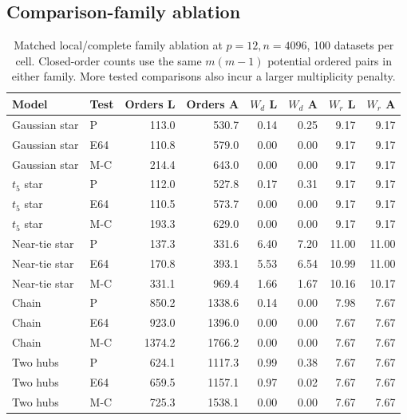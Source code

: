\subsection{Comparison-family ablation}
\begin{table}[htbp]\centering\small
\setlength{\tabcolsep}{4pt}
\caption{Matched local/complete family ablation at $p=12,n=4096$, 100 datasets per cell. Closed-order counts use the same $m(m-1)$ potential ordered pairs in either family. More tested comparisons also incur a larger multiplicity penalty.}\label{tab:family}
\begin{lrbox}{\resultsbox}\begin{tabular}{llrrrrrr}
\toprule
Model & Test & Orders L & Orders A & $W_d$ L & $W_d$ A & $W_r$ L & $W_r$ A\\
\midrule
Gaussian star & P & 113.0 & 530.7 & 0.14 & 0.25 & 9.17 & 9.17\\
Gaussian star & E64 & 110.8 & 579.0 & 0.00 & 0.00 & 9.17 & 9.17\\
Gaussian star & M-C & 214.4 & 643.0 & 0.00 & 0.00 & 9.17 & 9.17\\
$t_5$ star & P & 112.0 & 527.8 & 0.17 & 0.31 & 9.17 & 9.17\\
$t_5$ star & E64 & 110.5 & 573.7 & 0.00 & 0.00 & 9.17 & 9.17\\
$t_5$ star & M-C & 193.3 & 629.0 & 0.00 & 0.00 & 9.17 & 9.17\\
Near-tie star & P & 137.3 & 331.6 & 6.40 & 7.20 & 11.00 & 11.00\\
Near-tie star & E64 & 170.8 & 393.1 & 5.53 & 6.54 & 10.99 & 11.00\\
Near-tie star & M-C & 331.1 & 969.4 & 1.66 & 1.67 & 10.16 & 10.17\\
Chain & P & 850.2 & 1338.6 & 0.14 & 0.00 & 7.98 & 7.67\\
Chain & E64 & 923.0 & 1396.0 & 0.00 & 0.00 & 7.67 & 7.67\\
Chain & M-C & 1374.2 & 1766.2 & 0.00 & 0.00 & 7.67 & 7.67\\
Two hubs & P & 624.1 & 1117.3 & 0.99 & 0.38 & 7.67 & 7.67\\
Two hubs & E64 & 659.5 & 1157.1 & 0.97 & 0.02 & 7.67 & 7.67\\
Two hubs & M-C & 725.3 & 1538.1 & 0.00 & 0.00 & 7.67 & 7.67\\
\bottomrule\end{tabular}\end{lrbox}\ifdim\wd\resultsbox>\linewidth\resizebox{\linewidth}{!}{\usebox{\resultsbox}}\else\usebox{\resultsbox}\fi\end{table}
